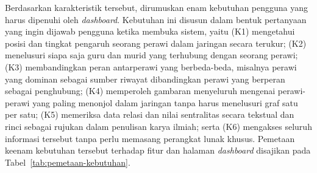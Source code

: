 Berdasarkan karakteristik tersebut, dirumuskan enam kebutuhan pengguna yang harus dipenuhi oleh \textit{dashboard}. Kebutuhan ini disusun dalam bentuk pertanyaan yang ingin dijawab pengguna ketika membuka sistem, yaitu (K1) mengetahui posisi dan tingkat pengaruh seorang perawi dalam jaringan secara terukur; (K2) menelusuri siapa saja guru dan murid yang terhubung dengan seorang perawi; (K3) membandingkan peran antarperawi yang berbeda-beda, misalnya perawi yang dominan sebagai sumber riwayat dibandingkan perawi yang berperan sebagai penghubung; (K4) memperoleh gambaran menyeluruh mengenai perawi-perawi yang paling menonjol dalam jaringan tanpa harus menelusuri graf satu per satu; (K5) memeriksa data relasi dan nilai sentralitas secara tekstual dan rinci sebagai rujukan dalam penulisan karya ilmiah; serta (K6) mengakses seluruh informasi tersebut tanpa perlu memasang perangkat lunak khusus. Pemetaan keenam kebutuhan tersebut terhadap fitur dan halaman \textit{dashboard} disajikan pada Tabel~\ref{tab:pemetaan-kebutuhan}.

\begin{table}[H]
\centering
\caption{Pemetaan kebutuhan pengguna terhadap fitur \textit{dashboard}}
\label{tab:pemetaan-kebutuhan}
\renewcommand{\arraystretch}{1.3}
\end{table}

